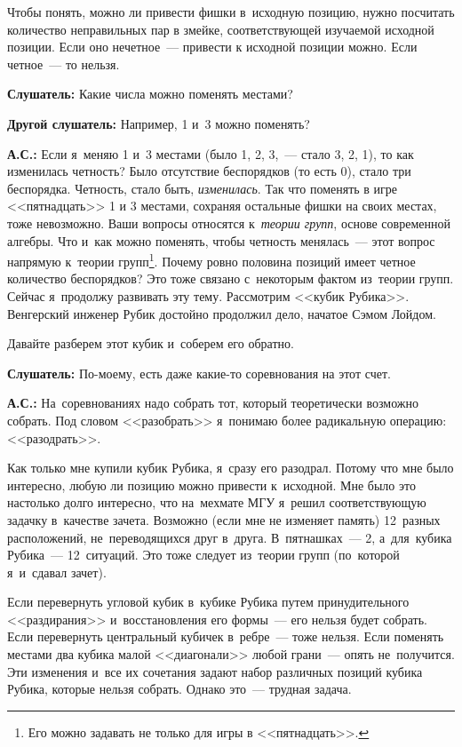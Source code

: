 Чтобы понять, можно ли привести фишки в~исходную позицию, нужно посчитать количество неправильных
пар в змейке, соответствующей изучаемой исходной позиции. Если оно нечетное~--- привести к исходной позиции можно. Если четное~--- то нельзя.

\textbf{Слушатель:} Какие числа можно поменять местами?

\textbf{Другой слушатель:} Например, 1 и~3 можно поменять?

\textbf{А.С.:} Если я~меняю 1 и~3 местами (было 1, 2, 3,~--- стало 3, 2, 1), то как изменилась четность?
Было отсутствие беспорядков (то есть 0), стало три беспорядка. Четность, стало быть, \textit{изменилась}.
Так что поменять в игре <<пятнадцать>> 1 и 3 местами, сохраняя остальные фишки на своих местах, тоже невозможно.
Ваши вопросы относятся к~\textit{теории групп}, основе современной алгебры. Что и~как можно поменять, чтобы
четность менялась~--- этот вопрос напрямую к~теории групп\footnote{Его можно задавать не только для игры в <<пятнадцать>>.}.
Почему ровно половина позиций имеет
четное количество беспорядков? Это тоже связано с~некоторым фактом из~теории групп. Сейчас
я~продолжу развивать эту тему. Рассмотрим <<кубик Рубика>>. Венгерский инженер Рубик достойно
продолжил дело, начатое Сэмом Лойдом.

Давайте разберем этот кубик и~соберем его обратно.


\textbf{Слушатель:} По-моему, есть даже какие-то соревнования на этот счет.

\textbf{А.С.:} На~соревнованиях надо собрать тот, который теоретически возможно собрать. Под словом
<<разобрать>> я~понимаю более радикальную операцию: <<разодрать>>.

Как только мне купили кубик Рубика, я~сразу его разодрал. Потому что мне было интересно, любую ли
позицию можно привести к~исходной. Мне было это настолько долго интересно, что на~мехмате МГУ
я~решил соответствующую задачку в~качестве зачета. Возможно (если мне не изменяет память) 12~разных расположений,
не~переводящихся друг в~друга.
 В~пятнашках~--- 2, а~для~кубика Рубика~--- 12~ситуаций. Это тоже
следует из~теории групп (по~которой я~и~сдавал зачет).

Если перевернуть угловой кубик в~кубике Рубика путем принудительного <<раздирания>>
и~восстановления его формы~--- его нельзя будет собрать. Если перевернуть центральный кубичек
в~ребре~--- тоже нельзя. Если поменять местами два кубика малой <<диагонали>>  любой грани~---
опять не~получится.
 Эти изменения и~все их сочетания задают набор различных позиций кубика Рубика,
которые нельзя собрать. Однако это~--- трудная задача.

